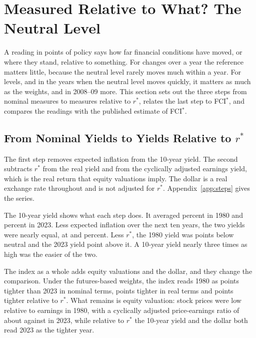 \documentclass[11pt]{article}
\begin{document}
\section{Measured Relative to What? The Neutral Level}\label{sec:neutral}
A reading in points of policy says how far financial conditions have moved, or where they stand, relative to something. For changes over a year the reference matters little, because the neutral level rarely moves much within a year. For levels, and in the years when the neutral level moves quickly, it matters as much as the weights, and in 2008--09 more. This section sets out the three steps from nominal measures to measures relative to $r^*$, relates the last step to FCI$^*$, and compares the readings with the published estimate of FCI$^*$.

\subsection{From Nominal Yields to Yields Relative to $r^*$}\label{sec:steps}
The first step removes expected inflation from the 10-year yield. The second subtracts $r^*$ from the real yield and from the cyclically adjusted earnings yield, which is the real return that equity valuations imply. The dollar is a real exchange rate throughout and is not adjusted for $r^*$. Appendix~\ref{app:steps} gives the series.

The 10-year yield shows what each step does. It averaged  percent in 1980 and  percent in 2023. Less expected inflation over the next ten years, the two yields were nearly equal, at  and  percent. Less $r^*$, the 1980 yield was  points below neutral and the 2023 yield  point above it. A 10-year yield nearly three times as high was the easier of the two.

The index as a whole adds equity valuations and the dollar, and they change the comparison. Under the futures-based weights, the index reads 1980 as  points tighter than 2023 in nominal terms,  points tighter in real terms and  points tighter relative to $r^*$. What remains is equity valuation: stock prices were low relative to earnings in 1980, with a cyclically adjusted price-earnings ratio of about  against  in 2023, while relative to $r^*$ the 10-year yield and the dollar both read 2023 as the tighter year.
\end{document}
